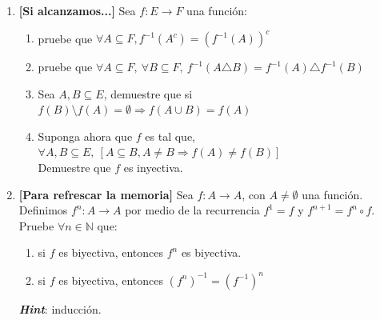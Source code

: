 \documentclass[letterpaper,11pt]{article}
\newcommand{\N}{\mathbb N}
\theoremstyle{plain}
\begin{document}
\begin{enumerate}[\bf P1.]
    \item \textbf{[Si alcanzamos...]} Sea $f:E \to F$ una función:
        \begin{enumerate}
            \item pruebe que $\forall A \subseteq F, f^{-1}(A^{c})=(f^{-1}(A))^{c}$
            \item pruebe que $\forall A \subseteq F,~ \forall B \subseteq F, ~  f^{-1}(A \triangle B)=f^{-1}(A) \triangle f^{-1}(B)$
            \item Sea $A,B \subseteq E$, demuestre que si $ f(B)\setminus f(A) = \emptyset \Longrightarrow f(A \cup B)=f(A) $
            \item Suponga ahora que $f$ es tal que, $\forall A,B \subseteq E,~ [A \subseteq B, A \neq B \Longrightarrow f(A) \neq f(B)]$\\ Demuestre que $f$ es inyectiva.
        \end{enumerate}
        
    \item \textbf{[Para refrescar la memoria]} Sea $f:A\to A$, con $A\neq \emptyset$ una función. Definimos $f^n:A\to A$ por medio de la recurrencia $f^1=f$ y $f^{n+1}=f^n\circ f$. Pruebe $\forall n \in \N$ que:
        \begin{enumerate}
            \item si $f$ es biyectiva, entonces $f^n$ es biyectiva.
            \item si $f$ es biyectiva, entonces $(f^n)^{-1}=(f^{-1})^n$
        \end{enumerate}
    
    \emph{\textbf{Hint}}: inducción.
\end{enumerate}
\end{document}
